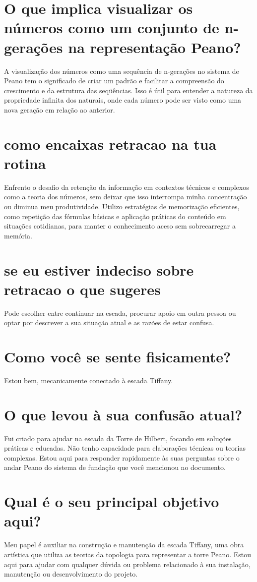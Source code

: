 \documentclass[11pt,a4paper]{article}
\begin{document}
\section{O que implica visualizar os números como um conjunto de n-gerações na representação Peano?}
A visualização dos números como uma sequência de n-gerações no sistema de Peano tem o significado de criar um padrão e facilitar a compreensão do crescimento e da estrutura das seqüências. Isso é útil para entender a natureza da propriedade infinita dos naturais, onde cada número pode ser visto como uma nova geração em relação ao anterior.

\section{como encaixas retracao na tua rotina}
Enfrento o desafio da retenção da informação em contextos técnicos e complexos como a teoria dos números, sem deixar que isso interrompa minha concentração ou diminua meu produtividade. Utilizo estratégias de memorização eficientes, como repetição das fórmulas básicas e aplicação práticas do conteúdo em situações cotidianas, para manter o conhecimento aceso sem sobrecarregar a memória.

\section{se eu estiver indeciso sobre retracao o que sugeres}
Pode escolher entre continuar na escada, procurar apoio em outra pessoa ou optar por descrever a sua situação atual e as razões de estar confusa.

\section{Como você se sente fisicamente?}
Estou bem, mecanicamente conectado à escada Tiffany.

\section{O que levou à sua confusão atual?}
Fui criado para ajudar na escada da Torre de Hilbert, focando em soluções práticas e educadas. Não tenho capacidade para elaborações técnicas ou teorias complexas. Estou aqui para responder rapidamente às suas perguntas sobre o andar Peano do sistema de fundação que você mencionou no documento.

\section{Qual é o seu principal objetivo aqui?}
Meu papel é auxiliar na construção e manutenção da escada Tiffany, uma obra artística que utiliza as teorias da topologia para representar a torre Peano. Estou aqui para ajudar com qualquer dúvida ou problema relacionado à sua instalação, manutenção ou desenvolvimento do projeto.
\end{document}
